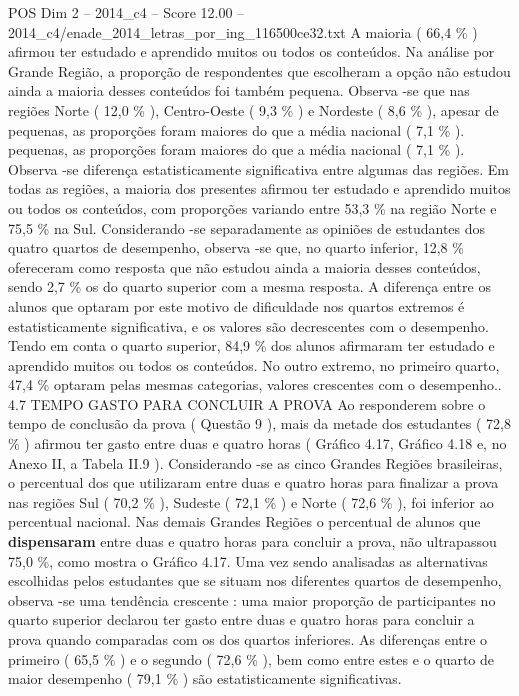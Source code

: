 \begin{textsample}{POS Dim 2 – 2014\_c4 – Score 12.00 – 2014\_c4/enade\_2014\_letras\_por\_ing\_116500ce32.txt}
A maioria ( 66,4 \% ) afirmou ter estudado e aprendido muitos ou todos os conteúdos.
Na análise por Grande Região, a proporção de respondentes que escolheram a opção não estudou ainda a maioria desses conteúdos foi também pequena.
Observa -se que nas regiões Norte ( 12,0 \% ), Centro-Oeste ( 9,3 \% ) e Nordeste ( 8,6 \% ), apesar de pequenas, as proporções foram maiores do que a média nacional ( 7,1 \% ). pequenas, as proporções foram maiores do que a média nacional ( 7,1 \% ).
Observa -se diferença estatisticamente significativa entre algumas das regiões.
Em todas as regiões, a maioria dos presentes afirmou ter estudado e aprendido muitos ou todos os conteúdos, com proporções variando entre 53,3 \% na região Norte e 75,5 \% na Sul.
Considerando -se separadamente as opiniões de estudantes dos quatro quartos de desempenho, observa -se que, no quarto inferior, 12,8 \% ofereceram como resposta que não estudou ainda a maioria desses conteúdos, sendo 2,7 \% os do quarto superior com a mesma resposta.
A diferença entre os alunos que optaram por este motivo de dificuldade nos quartos extremos é estatisticamente significativa, e os valores são decrescentes com o desempenho.
Tendo em conta o quarto superior, 84,9 \% dos alunos afirmaram ter estudado e aprendido muitos ou todos os conteúdos.
No outro extremo, no primeiro quarto, 47,4 \% optaram pelas mesmas categorias, valores crescentes com o desempenho.. 4.7 TEMPO GASTO PARA CONCLUIR A PROVA Ao responderem sobre o tempo de conclusão da prova ( Questão 9 ), mais da metade dos estudantes ( 72,8 \% ) afirmou ter gasto entre duas e quatro horas ( Gráfico 4.17, Gráfico 4.18 e, no Anexo II, a Tabela II.9 ).
Considerando -se as cinco Grandes Regiões brasileiras, o percentual dos que utilizaram entre duas e quatro horas para finalizar a prova nas regiões Sul ( 70,2 \% ), Sudeste ( 72,1 \% ) e Norte ( 72,6 \% ), foi inferior ao percentual nacional.
Nas demais Grandes Regiões o percentual de alunos que \textbf{dispensaram} entre duas e quatro horas para concluir a prova, não ultrapassou 75,0 \%, como mostra o Gráfico 4.17.
Uma vez sendo analisadas as alternativas escolhidas pelos estudantes que se situam nos diferentes quartos de desempenho, observa -se uma tendência crescente : uma maior proporção de participantes no quarto superior declarou ter gasto entre duas e quatro horas para concluir a prova quando comparadas com os dos quartos inferiores.
As diferenças entre o primeiro ( 65,5 \% ) e o segundo ( 72,6 \% ), bem como entre estes e o quarto de maior desempenho ( 79,1 \% ) são estatisticamente significativas.

\end{textsample}
